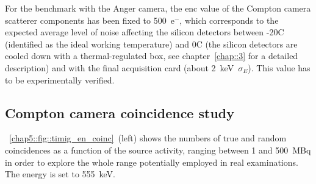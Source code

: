 For the benchmark with the Anger camera, the \gls{enc} value of the Compton camera scatterer components has been fixed to 500~e$^-$, which corresponds to the expected average level of noise affecting the silicon detectors between -20\textdegree{}C (identified as the ideal working temperature) and 0\textdegree{}C (the silicon detectors are cooled down with a thermal-regulated box, see chapter~\ref{chap::3} for a detailed description) and with the final acquisition card (about 2~keV~$\sigma_{E}$). This value has to be experimentally verified.

\subsection{Compton camera coincidence study}\label{chap5::sec::Results_CC_SPECT_coinc}
\figurename~\ref{chap5::fig::timig_en_coinc}~(left) shows the numbers of true and random coincidences as a function of the source activity, ranging between 1 and 500~MBq in order to explore the whole range potentially employed in real examinations. The energy is set to 555~keV.  

